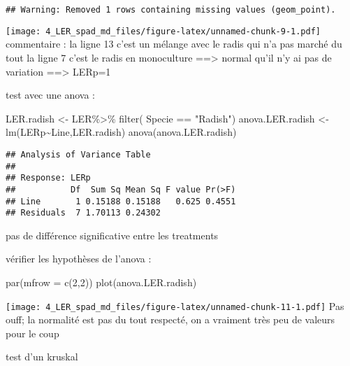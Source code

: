 \documentclass[
]{article}
\newenvironment{Shaded}{\begin{snugshade}}{\end{snugshade}}
\newcommand{\AttributeTok}[1]{\textcolor[rgb]{0.77,0.63,0.00}{#1}}
\newcommand{\DecValTok}[1]{\textcolor[rgb]{0.00,0.00,0.81}{#1}}
\newcommand{\FunctionTok}[1]{\textcolor[rgb]{0.00,0.00,0.00}{#1}}
\newcommand{\NormalTok}[1]{#1}
\newcommand{\OtherTok}[1]{\textcolor[rgb]{0.56,0.35,0.01}{#1}}
\newcommand{\SpecialCharTok}[1]{\textcolor[rgb]{0.00,0.00,0.00}{#1}}
\newcommand{\StringTok}[1]{\textcolor[rgb]{0.31,0.60,0.02}{#1}}
\begin{document}
\begin{verbatim}
## Warning: Removed 1 rows containing missing values (geom_point).
\end{verbatim}

\texttt{[image: 4\_LER\_spad\_md\_files/figure-latex/unnamed-chunk-9-1.pdf]}
commentaire : la ligne 13 c'est un mélange avec le radis qui n'a pas
marché du tout la ligne 7 c'est le radis en monoculture ==\textgreater{}
normal qu'il n'y ai pas de variation ==\textgreater{} LERp=1

test avec une anova :

\begin{Shaded}
\begin{Highlighting}[]
\NormalTok{LER.radish }\OtherTok{\textless{}{-}}\NormalTok{ LER}\SpecialCharTok{\%\textgreater{}\%}
  \FunctionTok{filter}\NormalTok{( Specie }\SpecialCharTok{==} \StringTok{"Radish"}\NormalTok{)}
\NormalTok{anova.LER.radish }\OtherTok{\textless{}{-}}\FunctionTok{lm}\NormalTok{(LERp}\SpecialCharTok{\textasciitilde{}}\NormalTok{Line,LER.radish)}
\FunctionTok{anova}\NormalTok{(anova.LER.radish)}
\end{Highlighting}
\end{Shaded}

\begin{verbatim}
## Analysis of Variance Table
## 
## Response: LERp
##           Df  Sum Sq Mean Sq F value Pr(>F)
## Line       1 0.15188 0.15188   0.625 0.4551
## Residuals  7 1.70113 0.24302
\end{verbatim}

pas de différence significative entre les treatments

vérifier les hypothèses de l'anova :

\begin{Shaded}
\begin{Highlighting}[]
\FunctionTok{par}\NormalTok{(}\AttributeTok{mfrow =} \FunctionTok{c}\NormalTok{(}\DecValTok{2}\NormalTok{,}\DecValTok{2}\NormalTok{))}
\FunctionTok{plot}\NormalTok{(anova.LER.radish)}
\end{Highlighting}
\end{Shaded}

\texttt{[image: 4\_LER\_spad\_md\_files/figure-latex/unnamed-chunk-11-1.pdf]}
Pas ouff; la normalité est pas du tout respecté, on a vraiment très peu
de valeurs pour le coup

test d'un kruskal

\begin{Shaded}
\end{Shaded}
\end{document}
